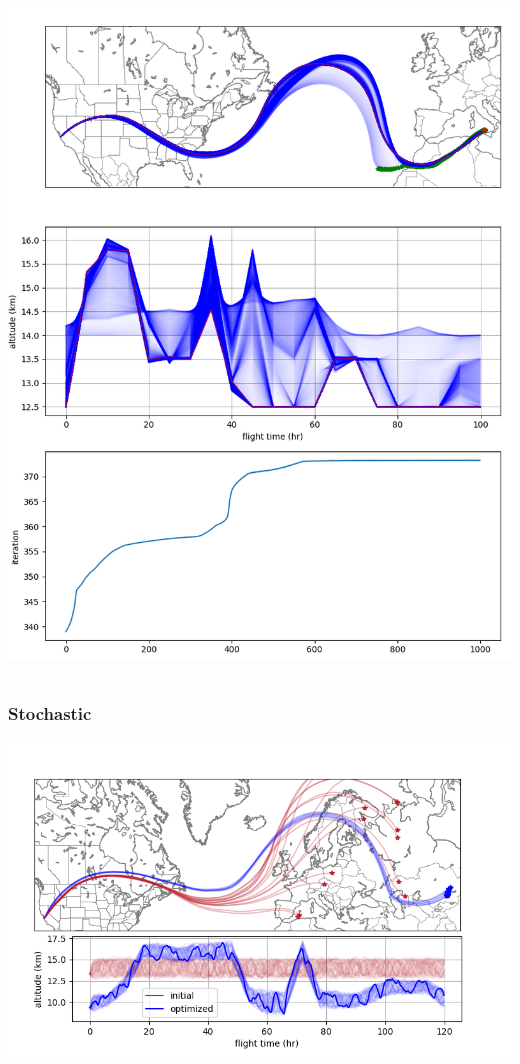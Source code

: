 \documentclass[10pt,mathserif]{beamer}
\begin{document}
\begin{frame}
\begin{columns}
\includegraphics[width=1\linewidth,trim={0 0cm 0 18.3cm},clip]{certaintyeq.png}
\end{columns}
\end{frame}

\begin{frame}
\frametitle{Stochastic}
\includegraphics[width=1\linewidth,trim={0 0cm 0 0cm},clip]{datasheetfig.png}
\end{frame}
\end{document}
